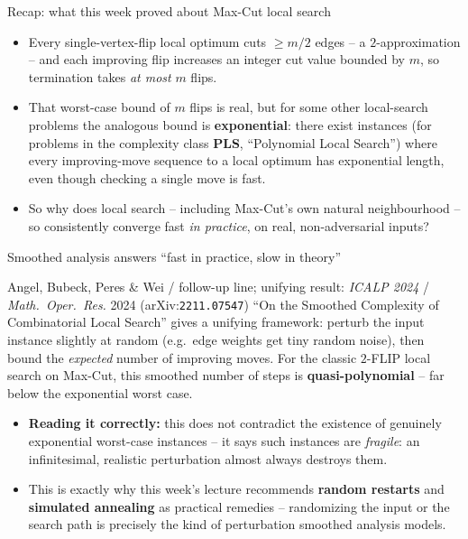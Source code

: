 \documentclass[11pt,aspectratio=169]{beamer}
\begin{document}
\begin{frame}{Recap: what this week proved about Max-Cut local search}
  \begin{itemize}
    \item Every single-vertex-flip local optimum cuts $\ge m/2$ edges -- a
    $2$-approximation -- and each improving flip increases an integer cut value bounded
    by $m$, so termination takes \emph{at most} $m$ flips.
    \item That worst-case bound of $m$ flips is real, but for some other local-search
    problems the analogous bound is \textbf{exponential}: there exist instances (for
    problems in the complexity class \textbf{PLS}, ``Polynomial Local Search'') where
    every improving-move sequence to a local optimum has exponential length, even though
    checking a single move is fast.
    \item So why does local search -- including Max-Cut's own natural neighbourhood --
    so consistently converge fast \emph{in practice}, on real, non-adversarial inputs?
  \end{itemize}
\end{frame}

\begin{frame}{Smoothed analysis answers ``fast in practice, slow in theory''}
  \begin{block}{Angel, Bubeck, Peres \& Wei / follow-up line; unifying result: \emph{ICALP
  2024} / \emph{Math.\ Oper.\ Res.} 2024 (arXiv:\texttt{2211.07547})}
    ``On the Smoothed Complexity of Combinatorial Local Search'' gives a unifying
    framework: perturb the input instance slightly at random (e.g.\ edge weights get
    tiny random noise), then bound the \emph{expected} number of improving moves. For the
    classic $2$-FLIP local search on Max-Cut, this smoothed number of steps is
    \textbf{quasi-polynomial} -- far below the exponential worst case.
  \end{block}
  \begin{itemize}
    \item \textbf{Reading it correctly:} this does not contradict the existence of
    genuinely exponential worst-case instances -- it says such instances are
    \emph{fragile}: an infinitesimal, realistic perturbation almost always destroys them.
    \item This is exactly why this week's lecture recommends \textbf{random restarts}
    and \textbf{simulated annealing} as practical remedies -- randomizing the input or
    the search path is precisely the kind of perturbation smoothed analysis models.
  \end{itemize}
\end{frame}
\end{document}
